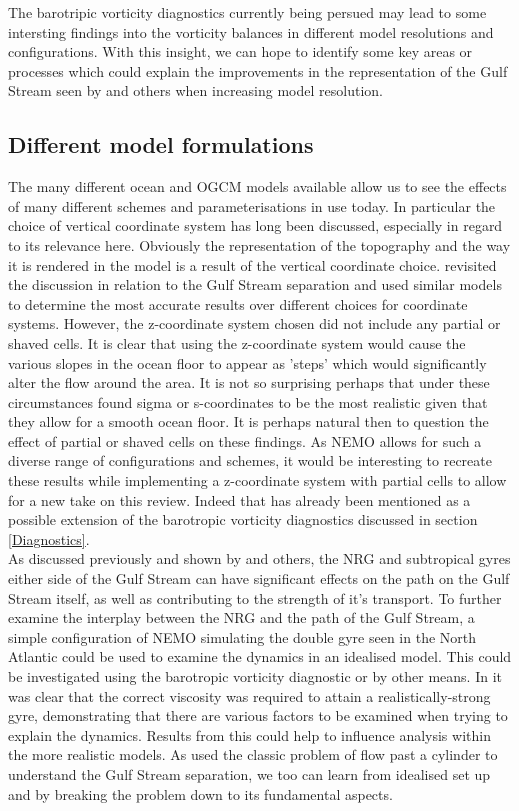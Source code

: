 \documentclass[..\EOYR.tex]{subfiles}
\begin{document}
The barotripic vorticity diagnostics currently being persued may lead to some intersting findings into the vorticity balances in different model resolutions and configurations. With this insight, we can hope to identify some key areas or processes which could explain the improvements in the representation of the Gulf Stream seen by \citep{Scaife2011} and others when increasing model resolution.


\subsection{Different model formulations}

The many different ocean and OGCM models available allow us to see the effects of many different schemes and parameterisations in use today. In particular the choice of vertical coordinate system has long been discussed, especially in regard to its relevance here. Obviously the representation of the topography and the way it is rendered in the model is a result of the vertical coordinate choice. \citep{Ezer2016b} revisited the discussion in relation to the Gulf Stream separation and used similar models to determine the most accurate results over different choices for coordinate systems. However, the z-coordinate system chosen did not include any partial or shaved cells.
It is clear that using the z-coordinate system would cause the various slopes in the ocean floor to appear as 'steps' which would significantly alter the flow around the area. It is not so surprising perhaps that under these circumstances \citep{Ezer2016b} found sigma or s-coordinates to be the most realistic given that they allow for a smooth ocean floor. It is perhaps natural then to question the effect of partial or shaved cells on these findings. As NEMO allows for such a diverse range of configurations and schemes, it would be interesting to recreate these results while implementing a z-coordinate system with partial cells to allow for a new take on this review. Indeed that has already been mentioned as a possible extension of the barotropic vorticity diagnostics discussed in section \ref{Diagnostics}.\\


As discussed previously and shown by \citep{Zhang2007} and others, the NRG and subtropical gyres either side of the Gulf Stream can have significant effects on the path on the Gulf Stream itself, as well as contributing to the strength of it's transport. 
To further examine the interplay between the NRG and the path of the Gulf Stream, a simple configuration of NEMO simulating the double gyre seen in the North Atlantic could be used to examine the dynamics in an idealised model. 
This could be investigated using the barotropic vorticity diagnostic or by other means. In \citep{Zhang2007} it was clear that the correct viscosity was required to attain a realistically-strong gyre, demonstrating that there are various factors to be examined when trying to explain the dynamics.
Results from this could help to influence analysis within the more realistic models. 
As \citep{Tansley2001} used the classic problem of flow past a cylinder to understand the Gulf Stream separation, we too can learn from idealised set up and by breaking the problem down to its fundamental aspects.
\end{document}

